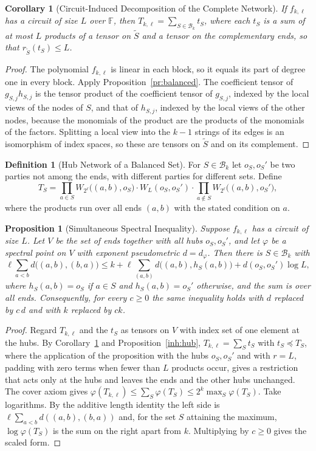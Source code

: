 \documentclass[11pt,letterpaper]{report}
\theoremstyle{plain}
\newtheorem{proposition}[theorem]{Proposition}
\newtheorem{corollary}[theorem]{Corollary}
\theoremstyle{definition}
\newtheorem{definition}[theorem]{Definition}
\theoremstyle{remark}
\begin{document}
\begin{corollary}[Circuit-Induced Decomposition of the Complete Network]\label{co:circuitdecomp}
If $f_{k,\ell}$ has a circuit of size $L$ over $\mathbb F$, then $T_{k,\ell}=\sum_{S\in\mathcal B_k}t_S$, where each $t_S$ is a sum of at most $L$ products of a tensor on $\tilde S$ and a tensor on the complementary ends, so that $r_{\tilde S}(t_S)\le L$.
\end{corollary}
\begin{proof}
The polynomial $f_{k,\ell}$ is linear in each block, so it equals its part of degree one in every block. Apply Proposition~\ref{pr:balanced}. The coefficient tensor of $g_{S,j}h_{S,j}$ is the tensor product of the coefficient tensor of $g_{S,j}$, indexed by the local views of the nodes of $S$, and that of $h_{S,j}$, indexed by the local views of the other nodes, because the monomials of the product are the products of the monomials of the factors. Splitting a local view into the $k-1$ strings of its edges is an isomorphism of index spaces, so these are tensors on $\tilde S$ and on its complement.
\end{proof}

\begin{definition}[Hub Network of a Balanced Set]
For $S\in\mathcal B_k$ let $o_S,o_S'$ be two parties not among the ends, with different parties for different sets. Define
\[
T_S=\prod_{a\in S}W_{2^{\ell}}\bigl((a,b),o_S\bigr)\cdot W_L(o_S,o_S')\cdot\prod_{a\notin S}W_{2^{\ell}}\bigl((a,b),o_S'\bigr),
\]
where the products run over all ends $(a,b)$ with the stated condition on $a$.
\end{definition}

\begin{proposition}[Simultaneous Spectral Inequality]\label{pr:simult}
Suppose $f_{k,\ell}$ has a circuit of size $L$. Let $V$ be the set of ends together with all hubs $o_S,o_S'$, and let $\varphi$ be a spectral point on $V$ with exponent pseudometric $d=d_\varphi$. Then there is $S\in\mathcal B_k$ with
\[
\ell\sum_{a<b}d\bigl((a,b),(b,a)\bigr)\le k+\ell\sum_{(a,b)}d\bigl((a,b),h_S(a,b)\bigr)+d(o_S,o_S')\log L,
\]
where $h_S(a,b)=o_S$ if $a\in S$ and $h_S(a,b)=o_S'$ otherwise, and the sum is over all ends. Consequently, for every $c\ge0$ the same inequality holds with $d$ replaced by $c\,d$ and with $k$ replaced by $ck$.
\end{proposition}
\begin{proof}
Regard $T_{k,\ell}$ and the $t_S$ as tensors on $V$ with index set of one element at the hubs. By Corollary~\ref{co:circuitdecomp} and Proposition~\ref{inh:hub}, $T_{k,\ell}=\sum_St_S$ with $t_S\preceq T_S$, where the application of the proposition with the hubs $o_S,o_S'$ and with $r=L$, padding with zero terms when fewer than $L$ products occur, gives a restriction that acts only at the hubs and leaves the ends and the other hubs unchanged. The cover axiom gives $\varphi(T_{k,\ell})\le\sum_S\varphi(T_S)\le2^k\max_S\varphi(T_S)$. Take logarithms. By the additive length identity the left side is $\ell\sum_{a<b}d((a,b),(b,a))$ and, for the set $S$ attaining the maximum, $\log\varphi(T_S)$ is the sum on the right apart from $k$. Multiplying by $c\ge0$ gives the scaled form.
\end{proof}
\end{document}
